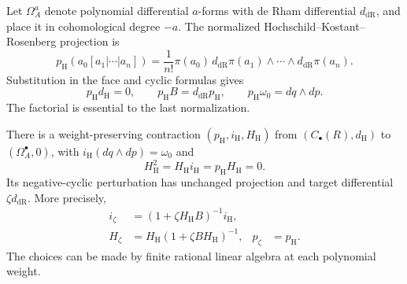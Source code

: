 Let $\Omega_A^a$ denote polynomial differential $a$-forms with
de Rham differential $d_{\mathrm{dR}}$, and place it in
cohomological degree $-a$. The normalized
Hochschild--Kostant--Rosenberg projection is
\begin{equation}\label{eq:vol2-plane-hkr-projection}
 p_{\mathrm H}(a_0[a_1|\cdots|a_n])
  =\frac1{n!}\pi(a_0)\,d_{\mathrm{dR}}\pi(a_1)
                     \wedge\cdots\wedge d_{\mathrm{dR}}\pi(a_n).
\end{equation}
Substitution in the face and cyclic formulas gives
\[
 p_{\mathrm H}d_{\mathrm H}=0,
 \qquad p_{\mathrm H}B=d_{\mathrm{dR}}p_{\mathrm H},
 \qquad p_{\mathrm H}\omega_0=dq\wedge dp.
\]
The factorial is essential to the last normalization.

\begin{proposition}\label{prop:vol2-mixed-plane-contraction}
There is a weight-preserving contraction
$(p_{\mathrm H},i_{\mathrm H},H_{\mathrm H})$ from
$(C_\bullet(R),d_{\mathrm H})$ to $(\Omega_A^\bullet,0)$,
with $i_{\mathrm H}(dq\wedge dp)=\omega_0$ and
\[
 H_{\mathrm H}^2=H_{\mathrm H}i_{\mathrm H}
                =p_{\mathrm H}H_{\mathrm H}=0.
\]
Its negative-cyclic perturbation has unchanged projection and
target differential $\zeta d_{\mathrm{dR}}$. More precisely,
\begin{equation}\label{eq:vol2-mixed-plane-perturbation}
 \begin{aligned}
 i_\zeta&=(1+\zeta H_{\mathrm H}B)^{-1}i_{\mathrm H},\\
 H_\zeta&=H_{\mathrm H}(1+\zeta BH_{\mathrm H})^{-1},
       &p_\zeta&=p_{\mathrm H}.
 \end{aligned}
\end{equation}
The choices can be made by finite rational linear algebra at
each polynomial weight.
\end{proposition}
